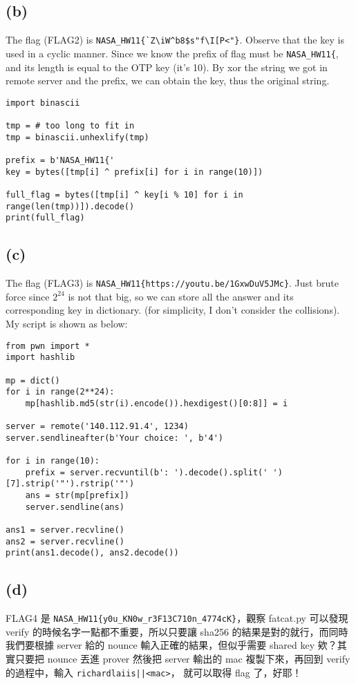 \documentclass[12pt]{article}
\begin{document}
\subsection*{(b)}
The flag (FLAG2) is \verb|NASA_HW11{`Z\iW^b8$s"f\I[P<"}|. Observe that the key is used in a cyclic manner. Since we know the prefix of flag must be \verb|NASA_HW11{|, and its length is equal to the OTP key (it's 10). By xor the string we got in remote server and the prefix, we can obtain the key, thus the original string.
\begin{verbatim}
import binascii

tmp = # too long to fit in
tmp = binascii.unhexlify(tmp)

prefix = b'NASA_HW11{'
key = bytes([tmp[i] ^ prefix[i] for i in range(10)])

full_flag = bytes([tmp[i] ^ key[i % 10] for i in range(len(tmp))]).decode()
print(full_flag)
\end{verbatim}
\subsection*{(c)}
The flag (FLAG3) is \verb|NASA_HW11{https://youtu.be/1GxwDuV5JMc}|. Just brute force since $2^{24}$ is not that big, so we can store all the answer and its corresponding key in dictionary. (for simplicity, I don't consider the collisions). My script is shown as below:
\begin{verbatim}
from pwn import *
import hashlib

mp = dict()
for i in range(2**24):
    mp[hashlib.md5(str(i).encode()).hexdigest()[0:8]] = i

server = remote('140.112.91.4', 1234)
server.sendlineafter(b'Your choice: ', b'4')

for i in range(10):
    prefix = server.recvuntil(b': ').decode().split(' ')[7].strip('"').rstrip('"')
    ans = str(mp[prefix])
    server.sendline(ans)

ans1 = server.recvline()
ans2 = server.recvline()
print(ans1.decode(), ans2.decode())
\end{verbatim}
\subsection*{(d)}
FLAG4 是 \verb|NASA_HW11{y0u_KN0w_r3F13C710n_4774cK}|，觀察 fatcat.py 可以發現 verify 的時候名字一點都不重要，所以只要讓 sha256 的結果是對的就行，而同時我們要根據 server 給的 nounce 輸入正確的結果，但似乎需要 shared key 欸？其實只要把 nounce 丟進 prover 然後把 server 輸出的 mac 複製下來，再回到 verify 的過程中，輸入 \texttt{richardlaiis||<mac>}， 就可以取得 flag 了，好耶！
\end{document}
